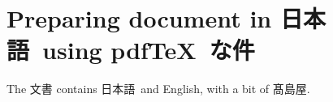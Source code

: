 \documentclass[a4paper]{article} %
\newcommand\Nihongo{日本語} %
\begin{document}
\section{Preparing document in \Nihongo\ using pdf\TeX\ な件}
The 文書 contains \Nihongo\ and English,
with a bit of 髙島屋.
\end{document}
